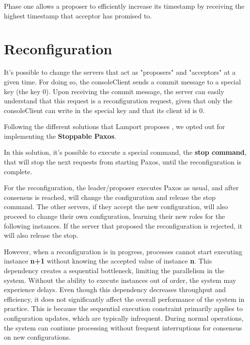 \documentclass[times, 10pt,twocolumn]{article}
\begin{document}
Phase one allows a proposer to efficiently increase its timestamp by receiving the highest timestamp that acceptor has promised to.

\section{Reconfiguration}

It's possible to change the servers that act as "proposers" and "acceptors" at a given time. For doing so, the consoleClient sends a commit message to a special key (the key 0). Upon receiving the commit message, the server can easily understand that this request is a reconfiguration request, given that only the consoleClient can write in the special key and that its client id is 0.

Following the different solutions that Lamport proposes \cite{ex2}, we opted out for implementing the \textbf{Stoppable Paxos}.

In this solution, it's possible to execute a special command, the \textbf{stop command}, that will stop the next requests from starting Paxos, until the reconfiguration is complete.

For the reconfiguration, the leader/proposer executes Paxos as usual, and after consensus is reached, will change the configuration and release the stop command. The other servers, if they accept the new configuration, will also proceed to change their own configuration, learning their new roles for
the following instances. If the server that proposed the reconfiguration is rejected, it will also release the stop.

However, when a reconfiguration is in progress, processes cannot start executing instance \textbf{n+1} without knowing the accepted value of instance \textbf{n}. This dependency creates a sequential bottleneck, limiting the parallelism in the system. Without the ability to execute instances out of order, the system may experience delays. Even though this dependency decreases throughput and efficiency, it does not significantly affect the overall performance of the system in practice. This is because the sequential execution constraint primarily applies to configuration updates, which are typically infrequent. During normal operations, the system can continue processing without frequent interruptions for consensus on new configurations.

\end{document}
